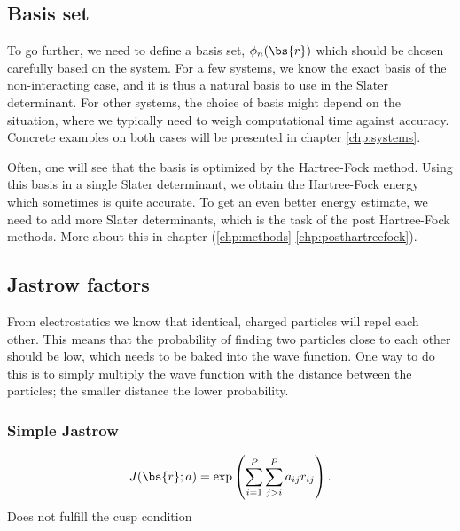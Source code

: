 \subsection{Basis set} \label{subsec:basisset}
To go further, we need to define a basis set, $\phi_n(\bs{r})$ which should be chosen carefully based on the system. For a few systems, we know the exact basis of the non-interacting case, and it is thus a natural basis to use in the Slater determinant. For other systems, the choice of basis might depend on the situation, where we typically need to weigh computational time against accuracy. Concrete examples on both cases will be presented in chapter \eqref{chp:systems}.

Often, one will see that the basis is optimized by the Hartree-Fock method. Using this basis in a single Slater determinant, we obtain the Hartree-Fock energy which sometimes is quite accurate. To get an even better energy estimate, we need to add more Slater determinants, which is the task of the post Hartree-Fock methods. More about this in chapter (\ref{chp:methods}-\ref{chp:posthartreefock}).

\subsection{Jastrow factors} \label{subsubsec:jastrow}
From electrostatics we know that identical, charged particles will repel each other. This means that the probability of finding two particles close to each other should be low, which needs to be baked into the wave function. One way to do this is to simply multiply the wave function with the distance between the particles; the smaller distance the lower probability. 

\subsubsection{Simple Jastrow}
\begin{equation}
J(\bs{r}; a) = \exp\left(\sum_{i=1}^P\sum_{j>i}^P{a_{ij}r_{ij}}\right).
\label{eq:SimpleJastrow}
\end{equation}
Does not fulfill the cusp condition


